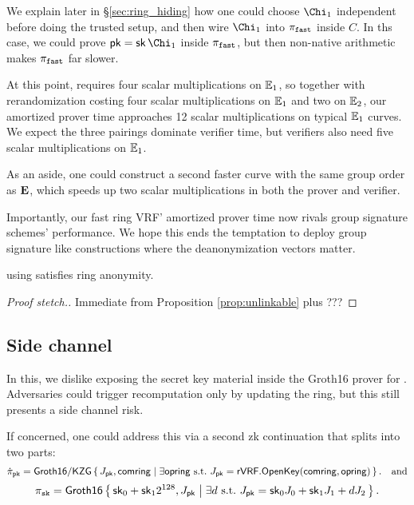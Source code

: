 We explain later in \S\ref{sec:ring_hiding} how one could
choose $\Chi_1$ independent before doing the trusted setup,
 and then wire $\Chi_1$ into $\pi_{\mathtt{fast}}$ inside $C$.
In ths case, we could prove $\pk = \sk\, \Chi_1$ inside $\pi_{\mathtt{fast}}$, but then
non-native arithmetic makes $\pi_{\mathtt{fast}}$ far slower.

At this point, \PedVRF requires four scalar multiplications on ${\mathbb{E}}_1$,
so together with rerandomization costing four scalar multiplications
on ${\mathbb{E}}_1$ and two on ${\mathbb{E}}_2$, our amortized prover time
 approaches 12 scalar multiplications on typical ${\mathbb{E}}_1$ curves. 
We expect the three pairings dominate verifier time, but
 verifiers also need five scalar multiplications on ${\mathbb{E}}_1$.

As an aside, one could construct a second faster curve with the same
group order as ${\mathbf{E}}$, which speeds up two scalar multiplications
 in both the prover and verifier. 

Importantly, our fast ring VRF' amortized prover time now rivals
group signature schemes' performance.  We hope this ends the temptation
to deploy group signature like constructions where the deanonymization vectors matter.

\begin{proposition}\label{prop:pifast_anonymity}
\rVRF using \pifast satisfies ring anonymity.
\end{proposition}

\begin{proof}[Proof stetch.]
Immediate from  Proposition \ref{prop:unlinkable} plus ???
\end{proof}


\subsection{Side channel}
\label{subsec:rvrf_side_channel}

In this, we dislike exposing the secret key material inside
 the Groth16 prover for \pifast.
Adversaries could trigger \pifast recomputation only by updating the ring,
but this still presents a side channel risk.

If concerned, one could address this via a second zk continuation that
splits \pifast into two parts: %
%
$$ \pipk = \rrSNARKweak \Setst{ J_\pk, \comring }{
 \exists \openring \textrm{\ s.t.\ }
  J_\pk = \rVRF.\OpenKey(\comring,\openring)
} \mathcomma \quad\textrm{and} $$ 
%
$$ \pisk = \rrSNARK \Setst{ \sk_0 + \sk_1 2^{128}, J_\pk }{ 
 \exists d \textrm{\ s.t.\ }
 J_\pk = \sk_0 \genJ_0 + \sk_1 \genJ_1 + d \genJ_2
} \mathperiod $$


